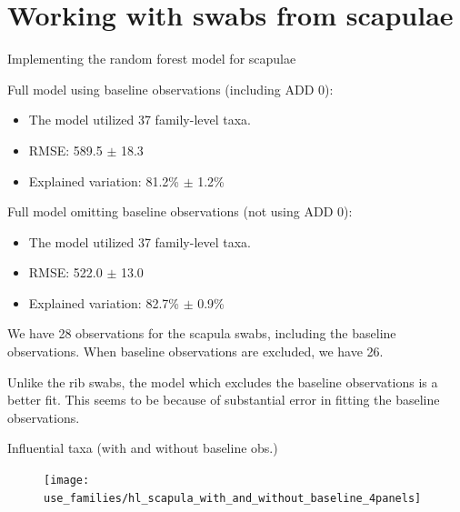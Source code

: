 \documentclass{beamer}
\begin{document}
\section[Scapula swabs]{Working with swabs from scapulae}

\begin{frame}{Implementing the random forest model for scapulae}

Full model using baseline observations (including ADD 0):
\begin{itemize}
  \item The model utilized 37 family-level taxa.
  \item RMSE: 589.5 $\pm$ 18.3
  \item Explained variation: 81.2\% $\pm$ 1.2\%
\end{itemize}

\vspace{0.1in}

Full model omitting baseline observations (not using ADD 0):
\begin{itemize}
  \item The model utilized 37 family-level taxa.
  \item RMSE: 522.0 $\pm$ 13.0
  \item Explained variation: 82.7\% $\pm$ 0.9\%\\
\end{itemize}

\vspace{0.1in}

We have 28 observations for the scapula swabs, including the baseline
observations.  When baseline observations are excluded, we have 26.

\vspace{0.1in} Unlike the rib swabs, the model which excludes the baseline
observations is a better fit.  This seems to be because of substantial error in
fitting the baseline observations.

\end{frame}



\begin{frame}{Influential taxa (with and without baseline obs.)}

  \begin{center}
    \begin{figure}
      \texttt{[image: use\_families/hl\_scapula\_with\_and\_without\_baseline\_4panels]}
    \end{figure}
  \end{center}
  \vspace{-0.1in}

\end{frame}
\end{document}
